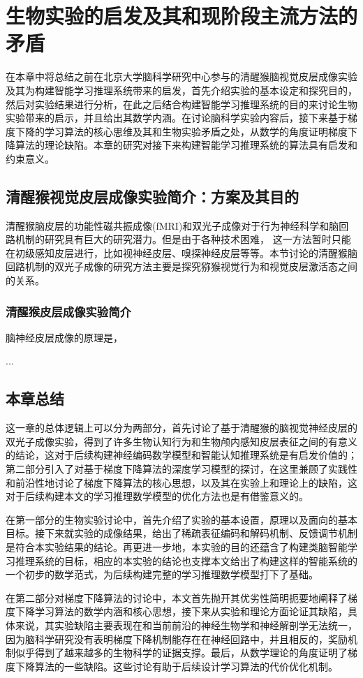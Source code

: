 

\chapter{生物实验的启发及其和现阶段主流方法的矛盾}
\label{cha:intro}

在本章中将总结之前在北京大学脑科学研究中心参与的清醒猴脑视觉皮层成像实验及其为构建智能学习推理系统带来的启发，首先介绍实验的基本设定和探究目的，然后对实验结果进行分析，在此之后结合构建智能学习推理系统的目的来讨论生物实验带来的启示，并且给出其数学内涵。在讨论脑科学实验内容后，接下来基于梯度下降的学习算法的核心思维及其和生物实验矛盾之处，从数学的角度证明梯度下降算法的理论缺陷。本章的研究对接下来构建智能学习推理系统的算法具有启发和约束意义。


  
\section{清醒猴视觉皮层成像实验简介：方案及其目的}
清醒猴脑皮层的功能性磁共振成像(fMRI)和双光子成像对于行为神经科学和脑回路机制的研究具有巨大的研究潜力。但是由于各种技术困难， 这一方法暂时只能在初级感知皮层进行，比如视神经皮层、嗅探神经皮层等等。本节讨论的清醒猴脑回路机制的双光子成像的研究方法主要是探究猕猴视觉行为和视觉皮层激活态之间的关系。


\subsection{清醒猴皮层成像实验简介}
脑神经皮层成像的原理是，

...

\section{本章总结}
这一章的总体逻辑上可以分为两部分，首先讨论了基于清醒猴的脑视觉神经皮层的双光子成像实验，得到了许多生物认知行为和生物颅内感知皮层表征之间的有意义的结论，这对于后续构建神经编码数学模型和智能认知推理系统是有启发价值的；第二部分引入了对基于梯度下降算法的深度学习模型的探讨，在这里兼顾了实践性和前沿性地讨论了梯度下降算法的核心思想，以及其在实验上和理论上的缺陷，这对于后续构建本文的学习推理数学模型的优化方法也是有借鉴意义的。


在第一部分的生物实验讨论中，首先介绍了实验的基本设置，原理以及面向的基本目标。接下来就实验的成像结果，给出了稀疏表征编码和解码机制、反馈调节机制是符合本实验结果的结论。再更进一步地，本实验的目的还蕴含了构建类脑智能学习推理系统的目标，相应的本实验的结论也支撑本文给出了构建这样的智能系统的一个初步的数学范式，为后续构建完整的学习推理数学模型打下了基础。


在第二部分对梯度下降算法的讨论中，本文首先抛开其优劣性简明扼要地阐释了梯度下降学习算法的数学内涵和核心思想，接下来从实验和理论方面论证其缺陷，具体来说，其实验缺陷主要表现在和当前前沿的神经生物学和神经解剖学无法统一，因为脑科学研究没有表明梯度下降机制能存在在神经回路中，并且相反的，奖励机制似乎得到了越来越多的生物科学的证据支撑。最后，从数学理论的角度证明了梯度下降算法的一些缺陷。这些讨论有助于后续设计学习算法的代价优化机制。